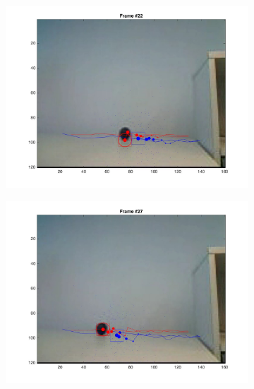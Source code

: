 \documentclass{ethz_report}
\begin{document}
\begin{figure}[h]
\begin{subfigure}[b]{.25\textwidth}
        \includegraphics[width=1\linewidth]{images/video3_model_21}
    \end{subfigure}%
    \begin{subfigure}[b]{.25\textwidth}
        \centering
        \includegraphics[width=1\linewidth]{images/video3_model_26}
    \end{subfigure}%
    \begin{subfigure}[b]{.25\textwidth}
        \centering

\end{subfigure}
\end{figure}
\end{document}
